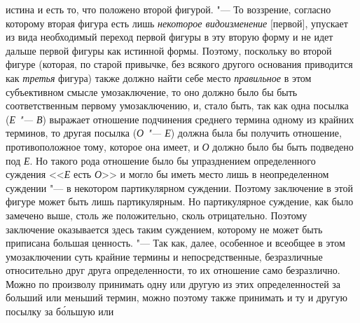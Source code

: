истина и есть то, что положено второй фигурой. "--- То
воззрение, согласно которому вторая фигура есть лишь
{\em некоторое видоизменение}
[первой], упускает из вида необходимый переход первой фигуры
в эту вторую форму и не идет дальше первой фигуры как
истинной формы. Поэтому, поскольку во второй фигуре (которая, по старой
привычке, без всякого другого основания приводится как
{\em третья} фигура) также должно найти себе место {\em правильное} в этом
субъективном смысле умозаключение, то оно должно было бы быть
соответственным первому умозаключению, и, стало быть, так как одна посылка
({\em Е "--- В}) выражает отношение подчинения среднего термина одному из
крайних терминов, то другая посылка ({\em О "--- Е})
должна была бы получить отношение, противоположное тому,
которое она имеет, и {\em О} должно было бы быть подведено под
{\em Е}. Но такого рода отношение было бы упразднением определенного суждения
<<{\em Е} есть {\em О}>> и могло бы иметь
место лишь в неопределенном суждении "--- в некотором
партикулярном суждении. Поэтому заключение в этой фигуре может быть лишь
партикулярным. Но партикулярное суждение, как было замечено выше, столь же
положительно, сколь отрицательно. Поэтому заключение оказывается здесь
таким суждением, которому не может быть приписана большая ценность. "---
Так как, далее, особенное и всеобщее в этом умозаключении
суть крайние термины и непосредственные, безразличные относительно друг
друга определенности, то их отношение само безразлично. Можно по произволу
принимать одну или другую из этих определенностей за больший или меньший
термин, можно поэтому также принимать и ту и другую посылку за б\'{о}льшую или
